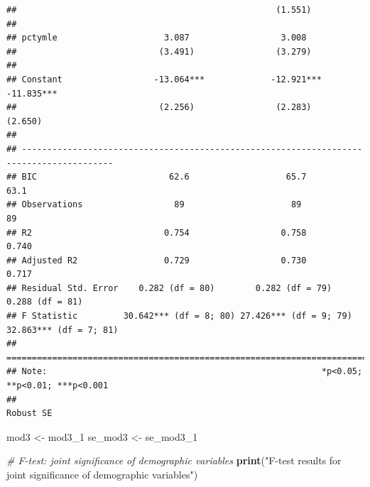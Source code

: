 \documentclass[]{article}
\newenvironment{Shaded}{\begin{snugshade}}{\end{snugshade}}
\newcommand{\CommentTok}[1]{\textcolor[rgb]{0.56,0.35,0.01}{\textit{#1}}}
\newcommand{\DecValTok}[1]{\textcolor[rgb]{0.00,0.00,0.81}{#1}}
\newcommand{\KeywordTok}[1]{\textcolor[rgb]{0.13,0.29,0.53}{\textbf{#1}}}
\newcommand{\NormalTok}[1]{#1}
\newcommand{\StringTok}[1]{\textcolor[rgb]{0.31,0.60,0.02}{#1}}
\begin{document}
\begin{verbatim}
##                                                   (1.551)                               
##                                                                                         
## pctymle                     3.087                  3.008                                
##                            (3.491)                (3.279)                               
##                                                                                         
## Constant                  -13.064***             -12.921***             -11.835***      
##                            (2.256)                (2.283)                (2.650)        
##                                                                                         
## ----------------------------------------------------------------------------------------
## BIC                          62.6                   65.7                   63.1         
## Observations                  89                     89                     89          
## R2                          0.754                  0.758                  0.740         
## Adjusted R2                 0.729                  0.730                  0.717         
## Residual Std. Error    0.282 (df = 80)        0.282 (df = 79)        0.288 (df = 81)    
## F Statistic         30.642*** (df = 8; 80) 27.426*** (df = 9; 79) 32.863*** (df = 7; 81)
## ========================================================================================
## Note:                                                      *p<0.05; **p<0.01; ***p<0.001
##                                                                                Robust SE
\end{verbatim}

\begin{Shaded}
\begin{Highlighting}[]
\NormalTok{mod3 <-}\StringTok{ }\NormalTok{mod3_}\DecValTok{1}
\NormalTok{se_mod3 <-}\StringTok{ }\NormalTok{se_mod3_}\DecValTok{1}
\end{Highlighting}
\end{Shaded}

\begin{Shaded}
\begin{Highlighting}[]
\CommentTok{# F-test: joint significance of demographic variables}
\KeywordTok{print}\NormalTok{(}\StringTok{"F-test results for joint significance of demographic variables"}\NormalTok{) }
\end{Highlighting}
\end{Shaded}
\end{document}
